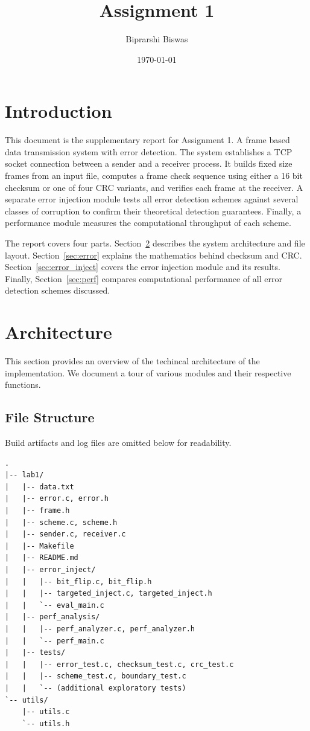 \documentclass[10pt]{article}
\title{Assignment 1}
\author{Biprarshi Biswas}
\date{\today}
\begin{document}
\maketitle

\section{Introduction}

This document is the supplementary report for Assignment 1. A frame based data transmission
system with error detection. The system establishes a TCP socket
connection between a sender and a receiver process. It builds fixed
size frames from an input file, computes a frame check sequence using
either a 16 bit checksum or one of four CRC variants, and verifies
each frame at the receiver. A separate error injection module tests
all error detection schemes against several classes of corruption to confirm their
theoretical detection guarantees. Finally, a performance module measures the
computational throughput of each scheme.

The report covers four parts. Section~\ref{sec:architecture} describes the system
architecture and file layout. Section~\ref{sec:error} explains the mathematics
behind checksum and CRC. Section~\ref{sec:error_inject} covers the error injection module
and its results. Finally, Section~\ref{sec:perf} compares computational performance of all error detection schemes discussed.

\section{Architecture}\label{sec:architecture}
This section provides an overview of the techincal architecture of the implementation. We document a tour of various modules and their respective functions.

\subsection{File Structure}

Build artifacts and log files are omitted below for readability.

\begin{verbatim}
.
|-- lab1/
|   |-- data.txt
|   |-- error.c, error.h
|   |-- frame.h
|   |-- scheme.c, scheme.h
|   |-- sender.c, receiver.c
|   |-- Makefile
|   |-- README.md
|   |-- error_inject/
|   |   |-- bit_flip.c, bit_flip.h
|   |   |-- targeted_inject.c, targeted_inject.h
|   |   `-- eval_main.c
|   |-- perf_analysis/
|   |   |-- perf_analyzer.c, perf_analyzer.h
|   |   `-- perf_main.c
|   |-- tests/
|   |   |-- error_test.c, checksum_test.c, crc_test.c
|   |   |-- scheme_test.c, boundary_test.c
|   |   `-- (additional exploratory tests)
`-- utils/
    |-- utils.c
    `-- utils.h
\end{verbatim}
\end{document}
